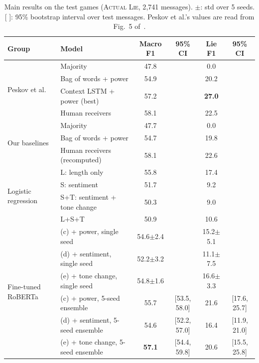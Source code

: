 \documentclass[conference]{IEEEtran}
\newcommand{\best}[1]{\textbf{#1}}
\begin{document}
\begin{table}[t]
\centering
\caption{Main results on the test games (\textsc{Actual Lie}, 2{,}741 messages). $\pm$: std over 5 seeds. [ ]: 95\% bootstrap interval over test messages. Peskov et al.'s values are read from Fig.~5 of~\cite{peskov2020takes}.}
\label{tab:main}
\begin{tabular}{llcccc}
\toprule
Group & Model & Macro F1 & 95\% CI & Lie F1 & 95\% CI \\
\midrule
\multirow{4}{*}{Peskov et al.~\cite{peskov2020takes}}
 & Majority                      & 47.8 & & \phantom{0}0.0 & \\
 & Bag of words + power          & 54.9 & & 20.2 & \\
 & Context LSTM + power (best)   & 57.2 & & \best{27.0} & \\
 & Human receivers               & 58.1 & & 22.5 & \\
\midrule
\multirow{3}{*}{Our baselines}
 & Majority                      & 47.7 & & \phantom{0}0.0 & \\
 & Bag of words + power          & 54.7 & & 19.8 & \\
 & Human receivers (recomputed)  & 58.1 & & 22.6 & \\
\midrule
\multirow{4}{*}{Logistic regression}
 & L: length only                & 55.8 & & 17.4 & \\
 & S: sentiment                  & 51.7 & & \phantom{0}9.2 & \\
 & S+T: sentiment + tone change  & 50.3 & & \phantom{0}9.0 & \\
 & L+S+T                         & 50.9 & & 10.6 & \\
\midrule
\multirow{6}{*}{Fine-tuned RoBERTa}
 & (c) + power, single seed            & 54.6$\pm$2.4 & & 15.2$\pm$5.1 & \\
 & (d) + sentiment, single seed        & 52.2$\pm$3.2 & & 11.1$\pm$7.5 & \\
 & (e) + tone change, single seed      & 54.8$\pm$1.6 & & 16.6$\pm$3.3 & \\
 & (c) + power, 5-seed ensemble        & 55.7 & [53.5, 58.0] & 21.6 & [17.6, 25.7] \\
 & (d) + sentiment, 5-seed ensemble    & 54.6 & [52.2, 57.0] & 16.4 & [11.9, 21.0] \\
 & (e) + tone change, 5-seed ensemble  & \best{57.1} & [54.4, 59.8] & 20.6 & [15.5, 25.8] \\
\bottomrule
\end{tabular}
\end{table}
\end{document}
